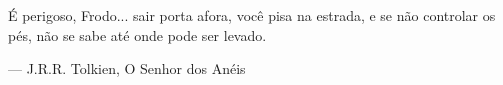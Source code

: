 \epigraph{É perigoso, Frodo... sair porta afora, você pisa na estrada, e se não controlar os pés, não se sabe até onde pode ser levado.}{— J.R.R. Tolkien, O Senhor dos Anéis}

